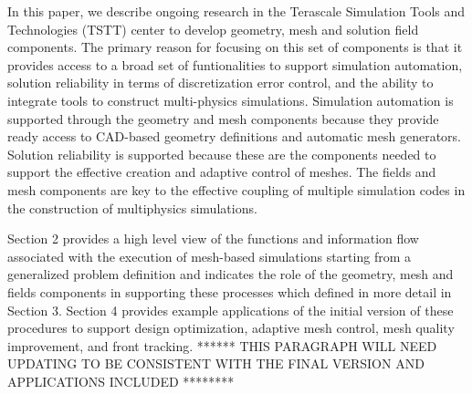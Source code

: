 In this paper, we describe ongoing research in the Terascale
Simulation Tools and Technologies (TSTT) center to develop geometry,
mesh and solution field components.  The primary reason for focusing
on this set of components is that it provides access to a broad set of
funtionalities to support simulation automation, solution reliability
in terms of discretization error control,
and the ability to integrate tools to construct multi-physics
simulations.  Simulation automation is supported through the geometry
and mesh components because they provide ready access to CAD-based
geometry definitions and automatic mesh generators. Solution
reliability is supported because these are the components needed to
support the effective creation and adaptive control of meshes. The
fields and mesh components are key to the effective coupling of
multiple simulation codes in the construction of multiphysics
simulations.

Section 2 provides a high level view of the functions and information
flow associated with the execution of mesh-based simulations starting
from a generalized problem definition and indicates the role of the
geometry, mesh and fields components in supporting these processes
which defined in more detail in Section 3. Section 4 provides example
applications of the initial version of these procedures to support
design optimization, adaptive mesh control, mesh quality improvement,
and front tracking. ****** THIS PARAGRAPH WILL NEED UPDATING TO BE
CONSISTENT WITH THE FINAL VERSION AND APPLICATIONS INCLUDED ********

